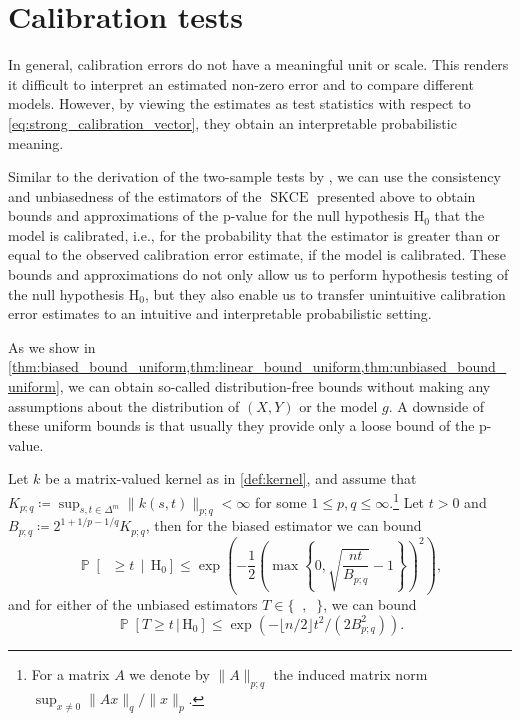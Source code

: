 \documentclass{article}
\DeclareMathOperator{\Prob}{\mathbb{P}}
\DeclareMathOperator{\squaredkernelmeasure}{SKCE}
\DeclareMathOperator{\biasedestimator}{\widehat{SKCE}_b}
\DeclareMathOperator{\unbiasedestimator}{\widehat{SKCE}_{uq}}
\DeclareMathOperator{\linearestimator}{\widehat{SKCE}_{ul}}
\newcommand{\nullhypothesis}{\mathrm{H}_0}
\newcommand{\given}{\,|\,}
\begin{document}
\section{Calibration tests}\label{sec:tests}

In general, calibration errors do not have a meaningful unit or scale. This
renders it difficult to interpret an estimated non-zero error and to compare
different models. However, by viewing the estimates as test statistics with
respect to \cref{eq:strong_calibration_vector}, they obtain an interpretable
probabilistic meaning.

Similar to the derivation of the two-sample tests by
\citet{gretton12_kernel_two_sampl_test}, we can use the consistency and
unbiasedness of the estimators of the $\squaredkernelmeasure$ presented above to
obtain bounds and approximations of the p-value for the null hypothesis
$\nullhypothesis$ that the model is calibrated, i.e., for the probability that
the estimator is greater than or equal to the observed calibration error estimate,
if the model is calibrated. These bounds and approximations do not only allow us
to perform hypothesis testing of the null hypothesis $\nullhypothesis$, but they
also enable us to transfer unintuitive calibration error estimates to an
intuitive and interpretable probabilistic setting.

As we show in \cref{thm:biased_bound_uniform,thm:linear_bound_uniform,thm:unbiased_bound_uniform},
we can obtain so-called distribution-free bounds without making any assumptions
about the distribution of $(X,Y)$ or the model $g$. A downside of these uniform
bounds is that usually they provide only a loose bound of the p-value.

\begin{lemma}
  Let $k$ be a matrix-valued kernel as in \cref{def:kernel}, and assume that
  $K_{p;q} \coloneqq \sup_{s,t \in \Delta^m} \|k(s,t)\|_{p;q} < \infty$ for some
  $1 \leq p,q \leq \infty$.\footnote{For a matrix $A$ we denote by
    $\|A\|_{p;q}$ the induced matrix norm
    $\sup_{x \neq 0} \|Ax\|_q / \|x\|_p$.} Let $t > 0$ and
  $B_{p;q} \coloneqq 2^{1 + 1 / p - 1 / q} K_{p;q}$, then for the biased estimator
  we can bound
  \begin{equation*}
    \Prob\left[\biasedestimator \geq t \,\middle|\, \nullhypothesis \right] \leq \exp{\left(-\frac{1}{2}{\left(\max \left\{0, \sqrt{\frac{nt}{B_{p;q}}} - 1 \right\}\right)}^2\right)},
  \end{equation*}
  and for either of the unbiased estimators
  $T \in \{\unbiasedestimator,\linearestimator\}$, we can bound
  \begin{equation*}
    \Prob[T \geq t \given \nullhypothesis] \leq \exp{(- \lfloor n/2 \rfloor t^2 / (2 B_{p;q}^2))}.
  \end{equation*}
\end{lemma}
\end{document}
